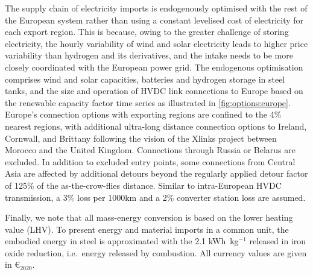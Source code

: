 The supply chain of electricity imports is endogenously optimised with the rest
of the European system rather than using a constant levelised cost of
electricity for each export region. This is because, owing to the greater
challenge of storing electricity, the hourly variability of wind and solar
electricity leads to higher price variability than hydrogen and its derivatives,
and the intake needs to be more closely coordinated with the European power
grid. The endogenous optimisation comprises wind and solar capacities, batteries
and hydrogen storage in steel tanks, and the size and operation of HVDC link
connections to Europe based on the renewable capacity factor time series as
illustrated in \cref{fig:options:europe}. Europe's connection options with
exporting regions are confined to the 4\% nearest regions, with additional
ultra-long distance connection options to Ireland, Cornwall, and Brittany
following the vision of the Xlinks project between Morocco and the United
Kingdom.\cite{xlinksMoroccoUKPowerProject2023} Connections through Russia or
Belarus are excluded. In addition to excluded entry points, some connections
from Central Asia are affected by additional detours beyond the regularly
applied detour factor of 125\% of the as-the-crow-flies distance. Similar to
intra-European HVDC transmission, a 3\% loss per 1000km and a 2\% converter
station loss are assumed.

\vspace{1em}

Finally, we note that all mass-energy conversion is based on the lower heating
value (LHV). To present energy and material imports in a common unit, the
embodied energy in steel is approximated with the 2.1 kWh~kg$^{-1}$ released in
iron oxide reduction, i.e.~energy released by
combustion.\cite{kuhnIronRecyclable2022} All currency values are given in
\euro{}$_{2020}$.
